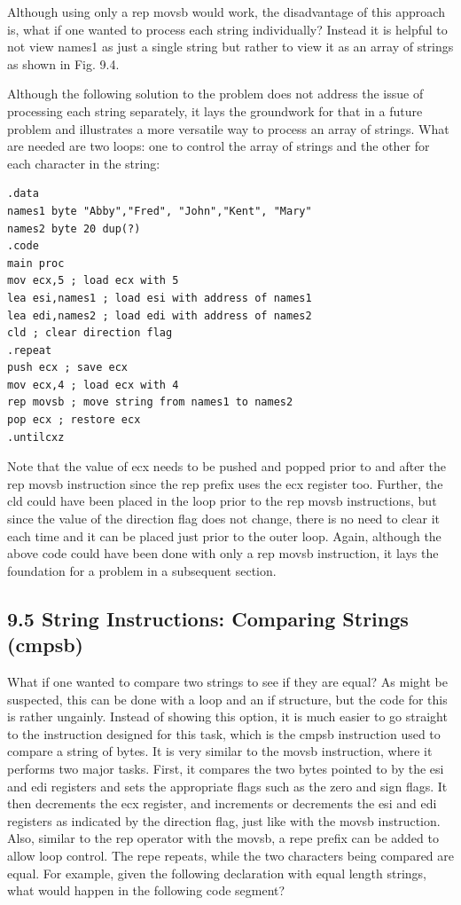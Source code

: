 \documentclass[10pt]{article}
\begin{document}
Although using only a rep movsb would work, the disadvantage of this approach is, what if one wanted to process each string individually? Instead it is helpful to not view names1 as just a single string but rather to view it as an array of strings as shown in Fig. 9.4.

Although the following solution to the problem does not address the issue of processing each string separately, it lays the groundwork for that in a future problem and illustrates a more versatile way to process an array of strings. What are needed are two loops: one to control the array of strings and the other for each character in the string:

\begin{verbatim}
.data
names1 byte "Abby","Fred", "John","Kent", "Mary"
names2 byte 20 dup(?)
.code
main proc
mov ecx,5 ; load ecx with 5
lea esi,names1 ; load esi with address of names1
lea edi,names2 ; load edi with address of names2
cld ; clear direction flag
.repeat
push ecx ; save ecx
mov ecx,4 ; load ecx with 4
rep movsb ; move string from names1 to names2
pop ecx ; restore ecx
.untilcxz
\end{verbatim}

Note that the value of ecx needs to be pushed and popped prior to and after the rep movsb instruction since the rep prefix uses the ecx register too. Further, the cld could have been placed in the loop prior to the rep movsb instructions, but since the value of the direction flag does not change, there is no need to clear it each time and it can be placed just prior to the outer loop. Again, although the above code could have been done with only a rep movsb instruction, it lays the foundation for a problem in a subsequent section.

\subsection*{9.5 String Instructions: Comparing Strings (cmpsb)}
What if one wanted to compare two strings to see if they are equal? As might be suspected, this can be done with a loop and an if structure, but the code for this is rather ungainly. Instead of showing this option, it is much easier to go straight to the instruction designed for this task, which is the cmpsb instruction used to compare a string of bytes. It is very similar to the movsb instruction, where it performs two major tasks. First, it compares the two bytes pointed to by the esi and edi registers and sets the appropriate flags such as the zero and sign flags. It then decrements the ecx register, and increments or decrements the esi and edi registers as indicated by the direction flag, just like with the movsb instruction. Also, similar to the rep operator with the movsb, a repe prefix can be added to allow loop control. The repe repeats, while the two characters being compared are equal. For example, given the following declaration with equal length strings, what would happen in the following code segment?
\end{document}
